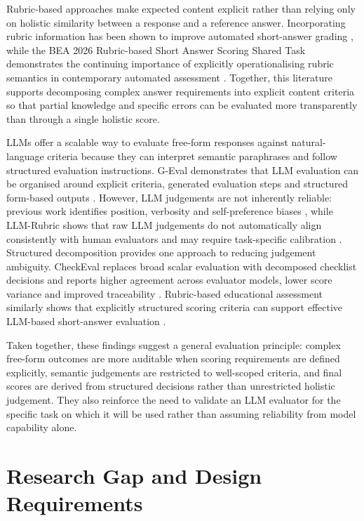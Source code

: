 Rubric-based approaches make expected content explicit rather than relying only on holistic similarity between a response and a reference answer. Incorporating rubric information has been shown to improve automated short-answer grading \cite{wang-etal-2019-inject}, while the BEA 2026 Rubric-based Short Answer Scoring Shared Task demonstrates the continuing importance of explicitly operationalising rubric semantics in contemporary automated assessment \cite{gombert-etal-2026-report}. Together, this literature supports decomposing complex answer requirements into explicit content criteria so that partial knowledge and specific errors can be evaluated more transparently than through a single holistic score.

LLMs offer a scalable way to evaluate free-form responses against natural-language criteria because they can interpret semantic paraphrases and follow structured evaluation instructions. G-Eval demonstrates that LLM evaluation can be organised around explicit criteria, generated evaluation steps and structured form-based outputs \cite{liu-etal-2023-g}. However, LLM judgements are not inherently reliable: previous work identifies position, verbosity and self-preference biases \cite{zheng-etal-2023-judging}, while LLM-Rubric shows that raw LLM judgements do not automatically align consistently with human evaluators and may require task-specific calibration \cite{hashemi-etal-2024-llm}. Structured decomposition provides one approach to reducing judgement ambiguity. CheckEval replaces broad scalar evaluation with decomposed checklist decisions and reports higher agreement across evaluator models, lower score variance and improved traceability \cite{lee-etal-2025-checkeval}. Rubric-based educational assessment similarly shows that explicitly structured scoring criteria can support effective LLM-based short-answer evaluation \cite{gombert-etal-2026-report}.

Taken together, these findings suggest a general evaluation principle: complex free-form outcomes are more auditable when scoring requirements are defined explicitly, semantic judgements are restricted to well-scoped criteria, and final scores are derived from structured decisions rather than unrestricted holistic judgement. They also reinforce the need to validate an LLM evaluator for the specific task on which it will be used rather than assuming reliability from model capability alone.

\section{Research Gap and Design Requirements}
\label{sec:research-gap-requirements}

